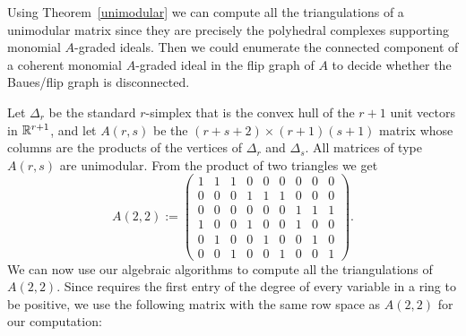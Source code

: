 Using Theorem~\ref{unimodular} we can compute all the triangulations
of a unimodular matrix since they are precisely the polyhedral
complexes supporting monomial $A$-graded ideals. Then we could
enumerate the connected component of a coherent monomial $A$-graded
ideal in the flip graph of $A$ to decide whether the Baues/flip graph
is disconnected.

Let $\Delta_r$ be the standard $r$-simplex that 
is the convex hull of the $r+1$ unit vectors in $\mathbb{R}^{r+1}$, and let 
$A(r,s)$ be the $(r+s+2) \times (r+1)(s+1)$ matrix whose columns 
are the products of the vertices of $\Delta_r$ and $\Delta_s$. All 
matrices of type $A(r,s)$ are unimodular. From the
product of two triangles we get $$A(2,2) := 
\left ( \begin{array}{ccccccccc}
1&1&1&0&0&0&0&0&0\\
0&0&0&1&1&1&0&0&0\\
0&0&0&0&0&0&1&1&1\\
1&0&0&1&0&0&1&0&0\\
0&1&0&0&1&0&0&1&0\\
0&0&1&0&0&1&0&0&1 \end{array} \right ).$$
We can now use our algebraic algorithms to compute all
the triangulations of $A(2,2)$. Since \Mtwo requires the first entry 
of the degree of every variable in a ring to be positive, we use 
the following matrix with the same row space as $A(2,2)$ for our 
computation:

